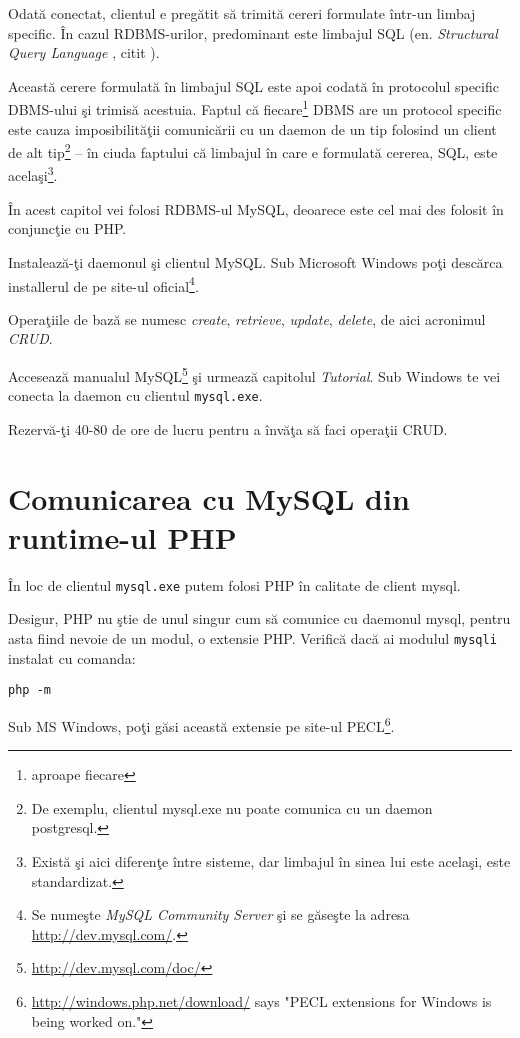 Odată conectat, clientul e pregătit să trimită cereri formulate
într-un limbaj specific. În cazul RDBMS-urilor, predominant este
limbajul SQL (en. \textsl{Structural Query Language}
, citit \texttt{}).%

Această cerere formulată în limbajul SQL este apoi codată în
protocolul specific DBMS-ului şi trimisă acestuia.
Faptul că fiecare\footnote{aproape fiecare} DBMS are un protocol
specific este cauza imposibilităţii comunicării cu un daemon
de un tip folosind un client de alt tip\footnote{De exemplu,
clientul mysql.exe nu poate comunica cu un daemon postgresql.}
-- în ciuda faptului că limbajul în care e formulată cererea, SQL,
este acelaşi\footnote{Există şi aici diferenţe între sisteme,
dar limbajul în sinea lui este acelaşi, este standardizat.}.

În acest capitol vei folosi RDBMS-ul MySQL, deoarece este
cel mai des folosit în conjuncţie cu PHP.

\begin{Exercise}[title={Primii paşi în baze de date}]
\ExePart

Instalează-ţi daemonul şi clientul MySQL. Sub Microsoft
Windows poţi descărca installerul de pe site-ul
oficial\footnote{Se numeşte \textit{MySQL Community Server} şi se găseşte
la adresa \url{http://dev.mysql.com/}.}.

\ExePart

Operaţiile de bază se numesc \textit{create}, \textit{retrieve},
\textit{update}, \textit{delete}, de aici acronimul \textsl{CRUD}.

Accesează manualul MySQL\footnote{\url{http://dev.mysql.com/doc/}}
şi urmează capitolul \textit{Tutorial}. Sub Windows te vei conecta la daemon
cu clientul \texttt{mysql.exe}.

Rezervă-ţi 40-80 de ore de lucru pentru a învăţa să faci operaţii CRUD.
\end{Exercise}

\section{Comunicarea cu MySQL din runtime-ul PHP}
În loc de clientul \texttt{mysql.exe} putem folosi PHP în
calitate de client mysql. 

Desigur, PHP nu ştie de unul singur cum să comunice cu daemonul mysql,
pentru asta fiind nevoie de un modul, o extensie PHP.
Verifică dacă ai modulul \texttt{mysqli} instalat cu comanda:
\begin{verbatim}
php -m
\end{verbatim}
Sub MS Windows, poţi găsi această extensie pe site-ul
PECL\footnote{\url{http://windows.php.net/download/} says
"PECL extensions for Windows is being worked on."
}.


